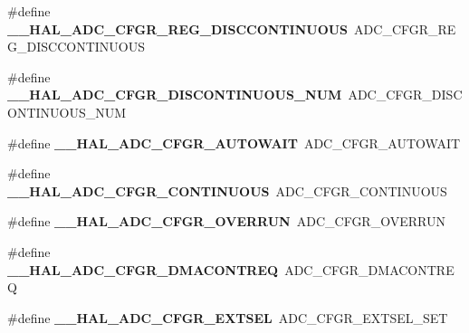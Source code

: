 \begin{DoxyCompactItemize}
\#define {\bfseries \+\_\+\+\_\+\+H\+A\+L\+\_\+\+A\+D\+C\+\_\+\+C\+F\+G\+R\+\_\+\+R\+E\+G\+\_\+\+D\+I\+S\+C\+C\+O\+N\+T\+I\+N\+U\+O\+US}~A\+D\+C\+\_\+\+C\+F\+G\+R\+\_\+\+R\+E\+G\+\_\+\+D\+I\+S\+C\+C\+O\+N\+T\+I\+N\+U\+O\+US
\item 
\mbox{\label{group___h_a_l___a_d_c___aliased___macros_ga6c152cf129addeff1a7f296fa89b04af}} 
\#define {\bfseries \+\_\+\+\_\+\+H\+A\+L\+\_\+\+A\+D\+C\+\_\+\+C\+F\+G\+R\+\_\+\+D\+I\+S\+C\+O\+N\+T\+I\+N\+U\+O\+U\+S\+\_\+\+N\+UM}~A\+D\+C\+\_\+\+C\+F\+G\+R\+\_\+\+D\+I\+S\+C\+O\+N\+T\+I\+N\+U\+O\+U\+S\+\_\+\+N\+UM
\item 
\mbox{\label{group___h_a_l___a_d_c___aliased___macros_ga2b6be3d51e5b71511f3db77d6781fc85}} 
\#define {\bfseries \+\_\+\+\_\+\+H\+A\+L\+\_\+\+A\+D\+C\+\_\+\+C\+F\+G\+R\+\_\+\+A\+U\+T\+O\+W\+A\+IT}~A\+D\+C\+\_\+\+C\+F\+G\+R\+\_\+\+A\+U\+T\+O\+W\+A\+IT
\item 
\mbox{\label{group___h_a_l___a_d_c___aliased___macros_gab45f96be007a67f1251d47410b5c9618}} 
\#define {\bfseries \+\_\+\+\_\+\+H\+A\+L\+\_\+\+A\+D\+C\+\_\+\+C\+F\+G\+R\+\_\+\+C\+O\+N\+T\+I\+N\+U\+O\+US}~A\+D\+C\+\_\+\+C\+F\+G\+R\+\_\+\+C\+O\+N\+T\+I\+N\+U\+O\+US
\item 
\mbox{\label{group___h_a_l___a_d_c___aliased___macros_ga4312a4ed4373cdd0302434574aa0c8c9}} 
\#define {\bfseries \+\_\+\+\_\+\+H\+A\+L\+\_\+\+A\+D\+C\+\_\+\+C\+F\+G\+R\+\_\+\+O\+V\+E\+R\+R\+UN}~A\+D\+C\+\_\+\+C\+F\+G\+R\+\_\+\+O\+V\+E\+R\+R\+UN
\item 
\mbox{\label{group___h_a_l___a_d_c___aliased___macros_gaa80ebf8b334aa3e040d153ec06c880e2}} 
\#define {\bfseries \+\_\+\+\_\+\+H\+A\+L\+\_\+\+A\+D\+C\+\_\+\+C\+F\+G\+R\+\_\+\+D\+M\+A\+C\+O\+N\+T\+R\+EQ}~A\+D\+C\+\_\+\+C\+F\+G\+R\+\_\+\+D\+M\+A\+C\+O\+N\+T\+R\+EQ
\item 
\mbox{\label{group___h_a_l___a_d_c___aliased___macros_gacc58e207b5fcc238afb480a00997d167}} 
\#define {\bfseries \+\_\+\+\_\+\+H\+A\+L\+\_\+\+A\+D\+C\+\_\+\+C\+F\+G\+R\+\_\+\+E\+X\+T\+S\+EL}~A\+D\+C\+\_\+\+C\+F\+G\+R\+\_\+\+E\+X\+T\+S\+E\+L\+\_\+\+S\+ET

\end{DoxyCompactItemize}
